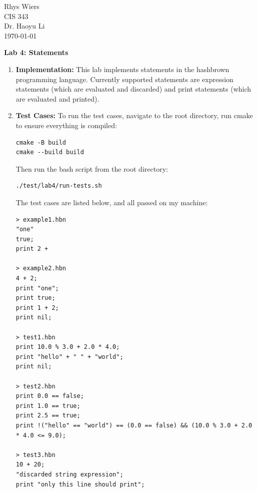 \documentclass[12pt]{article}
\theoremstyle{definition}
\begin{document}
    \noindent
    Rhys Wiers\\
    CIS 343\\
    Dr. Haoyu Li\\
    \today

    \begin{center}
        {\Large \textbf{Lab 4: Statements}}
    \end{center}

    \begin{enumerate}
        \item \textbf{Implementation:}
            This lab implements statements in the hashbrown programming language. Currently supported statements are expression statements (which are evaluated and discarded) and print statements (which are evaluated and printed).

        \item \textbf{Test Cases:}
            To run the test cases, navigate to the root directory, run cmake to ensure everything is compiled:
            \begin{verbatim}
cmake -B build
cmake --build build
            \end{verbatim}
                   
            Then run the bash script from the root directory:
            \begin{verbatim}
./test/lab4/run-tests.sh
            \end{verbatim}

            The test cases are listed below, and all passed on my machine:
            \begin{verbatim}
> example1.hbn
"one"
true;
print 2 +

> example2.hbn
4 + 2;
print "one";
print true;
print 1 + 2;
print nil;

> test1.hbn
print 10.0 % 3.0 + 2.0 * 4.0;
print "hello" + " " + "world";
print nil;

> test2.hbn
print 0.0 == false;
print 1.0 == true;
print 2.5 == true;
print !("hello" == "world") == (0.0 == false) && (10.0 % 3.0 + 2.0 * 4.0 <= 9.0);

> test3.hbn
10 + 20;
"discarded string expression";
print "only this line should print";
            \end{verbatim}
    \end{enumerate}
\end{document}
